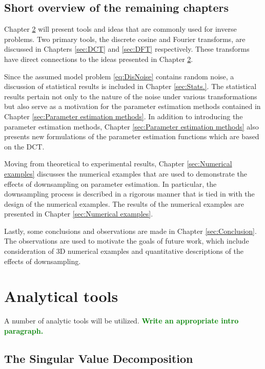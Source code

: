 \documentclass[12pt]{book}
\newcommand{\Todo}[1]{\textcolor{green}{\textbf{#1}}}
\begin{document}
\section{Short overview of the remaining chapters}
Chapter \ref{sec:Analytical tools} will present tools and ideas that are commonly used for inverse problems. Two primary tools, the discrete cosine and Fourier transforms, are discussed in Chapters \ref{sec:DCT} and \ref{sec:DFT} respectively. These transforms have direct connections to the ideas presented in Chapter \ref{sec:Analytical tools}. \par 
Since the assumed model problem \eqref{eq:DisNoise} contains random noise, a discussion of statistical results is included in Chapter \ref{sec:Stats.}. The statistical results pertain not only to the nature of the noise under various transformations but also serve as a motivation for the parameter estimation methods contained in Chapter \ref{sec:Parameter estimation methods}. In addition to introducing the parameter estimation methods, Chapter \ref{sec:Parameter estimation methods} also presents new formulations of the parameter estimation functions which are based on the DCT. \par 
Moving from theoretical to experimental results, Chapter \ref{sec:Numerical examples} discusses the numerical examples that are used to demonstrate the effects of downsampling on parameter estimation. In particular, the downsampling process is described in a rigorous manner that is tied in with the design of the numerical examples. The results of the numerical examples are presented in Chapter \ref{sec:Numerical examples}. \par 
Lastly, some conclusions and observations are made in Chapter \ref{sec:Conclusion}. The observations are used to motivate the goals of future work, which include consideration of 3D numerical examples and quantitative descriptions of the effects of downsampling.

\chapter{Analytical tools} \label{sec:Analytical tools}

A number of analytic tools will be utilized. \Todo{Write an appropriate intro paragraph.}

\section{The Singular Value Decomposition} \label{sec:SVD}
\end{document}
